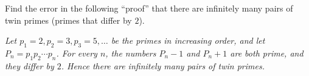 Find the error in the following ``proof'' that there are infinitely many pairs of twin primes (primes that differ by $2$).

\emph{Let $p_1=2,p_2=3,p_3=5,\dots$ be the primes in increasing order, and let $P_n=p_1p_2\cdots p_n$. For every $n$, the numbers $P_n-1$ and $P_n+1$ are both prime, and they differ by $2$. Hence there are infinitely many pairs of twin primes.}
